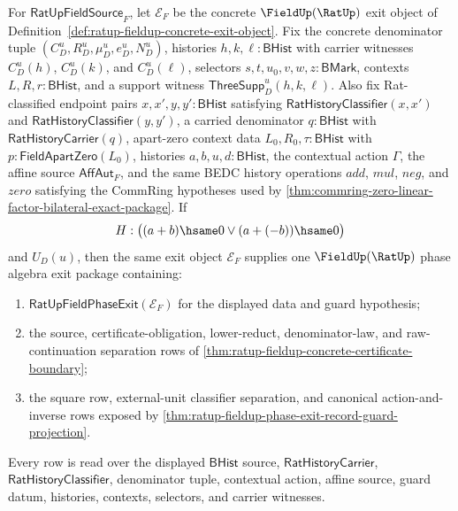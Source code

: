\begin{theorem}
\label{thm:ratup-fieldup-phase-exit-record-certificate-boundary}
For $\mathsf{RatUpFieldSource}_F$, let $\mathcal E_F$ be the concrete
$\FieldUp(\RatUp)$ exit object of
Definition~\ref{def:ratup-fieldup-concrete-exit-object}. Fix the concrete
denominator tuple $(C_D^u,R_D^u,\mu_D^u,e_D^u,N_D^u)$, histories
$h,k,\ell:\mathsf{BHist}$ with carrier witnesses $C_D^u(h)$, $C_D^u(k)$, and
$C_D^u(\ell)$, selectors $s,t,u_0,v,w,z:\mathsf{BMark}$, contexts
$L,R,r:\mathsf{BHist}$, and a support witness
$\mathsf{ThreeSupp}_D^u(h,k,\ell)$. Also fix Rat-classified endpoint pairs
$x,x',y,y':\mathsf{BHist}$ satisfying
$\mathsf{RatHistoryClassifier}(x,x')$ and
$\mathsf{RatHistoryClassifier}(y,y')$, a carried denominator
$q:\mathsf{BHist}$ with $\mathsf{RatHistoryCarrier}(q)$, apart-zero context data
$L_0,R_0,\tau:\mathsf{BHist}$ with $p:\mathsf{FieldApartZero}(L_0)$, histories
$a,b,u,d:\mathsf{BHist}$, the contextual action $\Gamma$, the affine source
$\mathsf{AffAut}_F$, and the same BEDC history operations $add$, $mul$, $neg$,
and $zero$ satisfying the CommRing hypotheses used by
\autoref{thm:commring-zero-linear-factor-bilateral-exact-package}. If
$$
H:\bigl((a+b)\hsame0 \lor (a+(-b))\hsame0\bigr)
$$
and $U_D(u)$, then the same exit object $\mathcal E_F$ supplies one
$\FieldUp(\RatUp)$ phase algebra exit package containing:
\begin{enumerate}
  \item $\mathsf{RatUpFieldPhaseExit}(\mathcal E_F)$ for the displayed data and
  guard hypothesis;
  \item the source, certificate-obligation, lower-reduct, denominator-law, and
  raw-continuation separation rows of
  \autoref{thm:ratup-fieldup-concrete-certificate-boundary};
  \item the square row, external-unit classifier separation, and canonical
  action-and-inverse rows exposed by
  \autoref{thm:ratup-fieldup-phase-exit-record-guard-projection}.
\end{enumerate}
Every row is read over the displayed $\mathsf{BHist}$ source,
$\mathsf{RatHistoryCarrier}$, $\mathsf{RatHistoryClassifier}$, denominator
tuple, contextual action, affine source, guard datum, histories, contexts,
selectors, and carrier witnesses.
\end{theorem}

